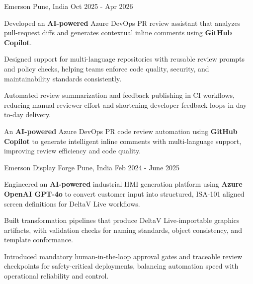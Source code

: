 \begin{cventries}
  \cventry
    {\ifcv Emerson\else\fi} %
    {} %
    {\ifcv Pune, India\else\fi} %
    {Oct 2025 - Apr 2026} %
    {
      \begin{cvitems} %
        \ifcv
          \item {Developed an \textbf{AI-powered} Azure DevOps PR review assistant that analyzes pull-request diffs and generates contextual inline comments using \textbf{GitHub Copilot}.}
          \item {Designed support for multi-language repositories with reusable review prompts and policy checks, helping teams enforce code quality, security, and maintainability standards consistently.}
          \item {Automated review summarization and feedback publishing in CI workflows, reducing manual reviewer effort and shortening developer feedback loops in day-to-day delivery.}
        \else
          \item {An \textbf{AI-powered} Azure DevOps PR code review automation using \textbf{GitHub Copilot} to generate intelligent inline comments with multi-language support, improving review efficiency and code quality.}
        \fi
      \end{cvitems}
    }

\ifcv
  \cventry
    {Emerson} %
    {Display Forge} %
    {Pune, India} %
    {Feb 2024 - June 2025} %
    {
      \begin{cvitems} %
        \item {Engineered an \textbf{AI-powered} industrial HMI generation platform using \textbf{Azure OpenAI GPT-4o} to convert customer input into structured, ISA-101 aligned screen definitions for DeltaV Live workflows.}
        \item {Built transformation pipelines that produce DeltaV Live-importable graphics artifacts, with validation checks for naming standards, object consistency, and template conformance.}
        \item {Introduced mandatory human-in-the-loop approval gates and traceable review checkpoints for safety-critical deployments, balancing automation speed with operational reliability and control.}
      \end{cvitems}
    }


\end{cventries}
